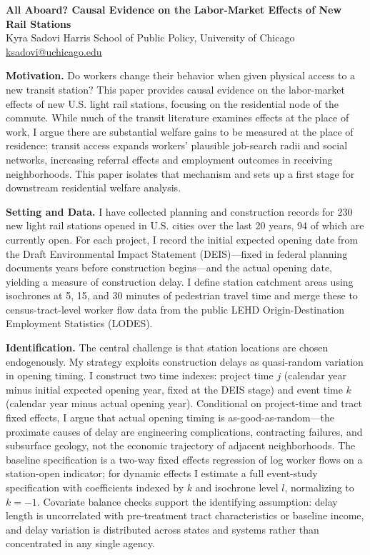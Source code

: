 \documentclass[11pt]{article}
\newcommand{\h}[1]{\textbf{\color{uchired}#1}\;}
\begin{document}
\begin{center}
  {\large\bfseries\color{uchired} All Aboard? Causal Evidence on the Labor-Market Effects of New Rail Stations}\\[3pt]
  {\normalsize Kyra Sadovi \enspace\textbullet\enspace Harris School of Public Policy, University of Chicago \enspace\textbullet\enspace \href{mailto:ksadovi@uchicago.edu}{ksadovi@uchicago.edu}}
\end{center}
\vspace{2pt}

\h{Motivation.} Do workers change their behavior when given physical access to a new transit station? This paper provides causal evidence on the labor-market effects of new U.S. light rail stations, focusing on the residential node of the commute. While much of the transit literature examines effects at the place of work, I argue there are substantial welfare gains to be measured at the place of residence: transit access expands workers' plausible job-search radii and social networks, increasing referral effects and employment outcomes in receiving neighborhoods. This paper isolates that mechanism and sets up a first stage for downstream residential welfare analysis.

\h{Setting and Data.} I have collected planning and construction records for 230 new light rail stations opened in U.S. cities over the last 20 years, 94 of which are currently open. For each project, I record the initial expected opening date from the Draft Environmental Impact Statement (DEIS)---fixed in federal planning documents years before construction begins---and the actual opening date, yielding a measure of construction delay. I define station catchment areas using isochrones at 5, 15, and 30 minutes of pedestrian travel time and merge these to census-tract-level worker flow data from the public LEHD Origin-Destination Employment Statistics (LODES).

\h{Identification.} The central challenge is that station locations are chosen endogenously. My strategy exploits construction delays as quasi-random variation in opening timing. I construct two time indexes: project time $j$ (calendar year minus initial expected opening year, fixed at the DEIS stage) and event time $k$ (calendar year minus actual opening year). Conditional on project-time and tract fixed effects, I argue that actual opening timing is as-good-as-random---the proximate causes of delay are engineering complications, contracting failures, and subsurface geology, not the economic trajectory of adjacent neighborhoods. The baseline specification is a two-way fixed effects regression of log worker flows on a station-open indicator; for dynamic effects I estimate a full event-study specification with coefficients indexed by $k$ and isochrone level $l$, normalizing to $k = -1$. Covariate balance checks support the identifying assumption: delay length is uncorrelated with pre-treatment tract characteristics or baseline income, and delay variation is distributed across states and systems rather than concentrated in any single agency.
\end{document}
